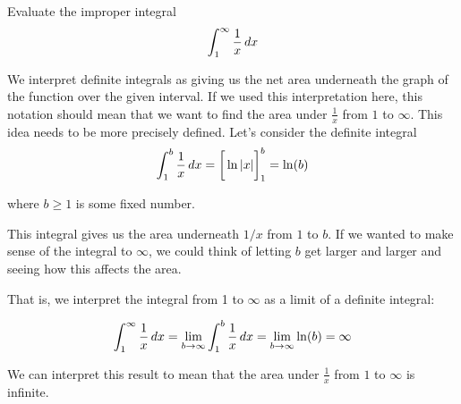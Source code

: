 \documentclass{ximera}
\begin{document}
\begin{example}
Evaluate the improper integral
\[
\int_{1}^{\infty} \frac{1}{x} \mathop{}\!d x
\]
\begin{explanation}

We interpret definite integrals as giving us the net area underneath the graph of the function over the given interval. If we used this interpretation here, this notation should mean that we want to find the area under $\frac{1}{x}$ from $1$ to $\infty$.  This idea needs to be more precisely defined.  Let's consider the definite integral
\[
\int_{1}^{b} \frac{1}{x} \mathop{}\!d x=\bigg[ \ln|x| \bigg]_{1}^{b}=\ln(b)
\]

where $b \geq 1$ is some fixed number.

\begin{image}
\end{image}


 This integral gives us the area underneath $1/x$ from $1$ to $b$. If we wanted to make sense of the integral to $\infty$, we could think of letting $b$
get larger and larger and seeing how this affects the area.

That is, we interpret the integral from 1 to $\infty$ as a limit of a definite integral:

\[
\int_{1}^{\infty} \frac{1}{x} \mathop{}\!d x= \lim_{b \to \infty} \int_{1}^{b} \frac{1}{x} \mathop{}\!d x= \lim_{b \to \infty} \ln(b) = \infty
\]

We can interpret this result to mean that the area under $\frac{1}{x}$ from $1$ to $\infty$ is infinite.
\end{explanation}
\end{example}
\end{document}
